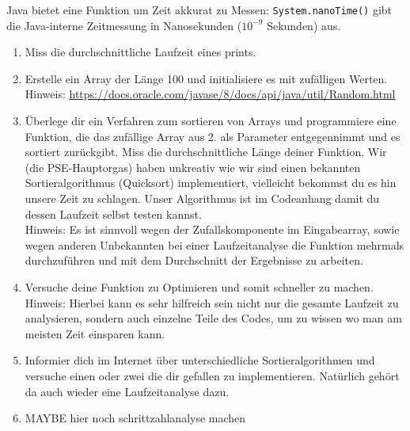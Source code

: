 \documentclass{../../sheet}
\begin{document}
\newpage
{}
Java bietet eine Funktion um Zeit akkurat zu Messen: \texttt{System.nanoTime()} gibt die Java-interne Zeitmessung in Nanosekunden ($10^{-9}$ Sekunden) aus. 
\begin{enumerate}
    \item Miss die durchschnittliche Laufzeit eines prints.
    \item Erstelle ein Array der Länge 100 und initialisiere es mit zufälligen Werten. \\ 
    Hinweis: \url{https://docs.oracle.com/javase/8/docs/api/java/util/Random.html}
    \item Überlege dir ein Verfahren zum sortieren von Arrays und programmiere eine Funktion, die das zufällige Array aus 2. als Parameter entgegennimmt und es sortiert zurückgibt. Miss die durchschnittliche Länge deiner Funktion. Wir (die PSE-Hauptorgas) haben unkreativ wie wir sind einen bekannten Sortieralgorithmus (Quicksort) implementiert, vielleicht bekommst du es hin unsere Zeit zu schlagen. Unser Algorithmus ist im Codeanhang damit du dessen Laufzeit selbst testen kannst. \\
    Hinweis: Es ist sinnvoll wegen der Zufallskomponente im Eingabearray, sowie wegen anderen Unbekannten bei einer Laufzeitanalyse die Funktion mehrmals durchzuführen und mit dem Durchschnitt der Ergebnisse zu arbeiten.
    \item Versuche deine Funktion zu Optimieren und somit schneller zu machen. \\
    Hinweis: Hierbei kann es sehr hilfreich sein nicht nur die gesamte Laufzeit zu analysieren, sondern auch einzelne Teile des Codes, um zu wissen wo man am meisten Zeit einsparen kann. 
    \item Informier dich im Internet über unterschiedliche Sortieralgorithmen und versuche einen oder zwei die dir gefallen zu implementieren. Natürlich gehört da auch wieder eine Laufzeitanalyse dazu.
    \item MAYBE hier noch schrittzahlanalyse machen
\end{enumerate}
\end{document}
